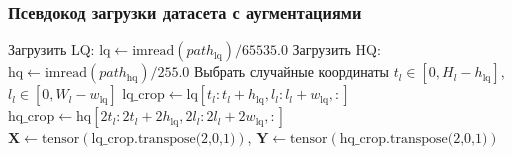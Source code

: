 \documentclass[12pt,a4paper]{article}
\begin{document}
\subsubsection{Псевдокод загрузки датасета с аугментациями}

\begin{algorithm}[H]
\SetAlgoLined
{}
\BlankLine
Загрузить LQ: $\text{lq} \leftarrow \text{imread}(path_{\text{lq}}) / 65535.0$ 
Загрузить HQ: $\text{hq} \leftarrow \text{imread}(path_{\text{hq}}) / 255.0$ 
Выбрать случайные координаты $t_l \in [0, H_l-h_{\text{lq}}]$, $l_l \in [0, W_l-w_{\text{lq}}]$
$\text{lq\_crop} \leftarrow \text{lq}[t_l:t_l+h_{\text{lq}}, l_l:l_l+w_{\text{lq}}, :]$
$\text{hq\_crop} \leftarrow \text{hq}[2t_l:2t_l+2h_{\text{lq}}, 2l_l:2l_l+2w_{\text{lq}}, :]$
$\mathbf{X} \leftarrow \text{tensor}(\text{lq\_crop.transpose(2,0,1)})$, $\mathbf{Y} \leftarrow \text{tensor}(\text{hq\_crop.transpose(2,0,1)})$

\caption{Получение элемента датасета с синхронными аугментациями}
\end{algorithm}
\end{document}
